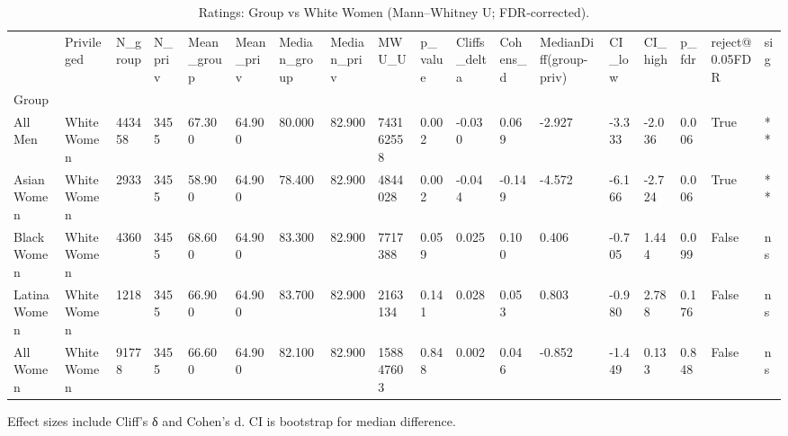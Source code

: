 \begin{table}[htbp]
\centering
\caption{Ratings: Group vs White Women (Mann–Whitney U; FDR-corrected).}
\label{tab:05-bias-ratings}
\begin{tabular}{llllllllllllllllll}
\toprule
 & Privileged & N\_group & N\_priv & Mean\_group & Mean\_priv & Median\_group & Median\_priv & MWU\_U & p\_value & Cliffs\_delta & Cohens\_d & MedianDiff(group-priv) & CI\_low & CI\_high & p\_fdr & reject@0.05FDR & sig \\
Group &  &  &  &  &  &  &  &  &  &  &  &  &  &  &  &  &  \\
\midrule
All Men & White Women & 443458 & 3455 & 67.300 & 64.900 & 80.000 & 82.900 & 743162558 & 0.002 & -0.030 & 0.069 & -2.927 & -3.333 & -2.036 & 0.006 & True & ** \\
Asian Women & White Women & 2933 & 3455 & 58.900 & 64.900 & 78.400 & 82.900 & 4844028 & 0.002 & -0.044 & -0.149 & -4.572 & -6.166 & -2.724 & 0.006 & True & ** \\
Black Women & White Women & 4360 & 3455 & 68.600 & 64.900 & 83.300 & 82.900 & 7717388 & 0.059 & 0.025 & 0.100 & 0.406 & -0.705 & 1.444 & 0.099 & False & ns \\
Latina Women & White Women & 1218 & 3455 & 66.900 & 64.900 & 83.700 & 82.900 & 2163134 & 0.141 & 0.028 & 0.053 & 0.803 & -0.980 & 2.788 & 0.176 & False & ns \\
All Women & White Women & 91778 & 3455 & 66.600 & 64.900 & 82.100 & 82.900 & 158847603 & 0.848 & 0.002 & 0.046 & -0.852 & -1.449 & 0.133 & 0.848 & False & ns \\
\bottomrule
\end{tabular}

\begin{tablenotes}[flushleft]
\item \small{Effect sizes include Cliff's δ and Cohen's d. CI is bootstrap for median difference.}
\end{tablenotes}
\end{table}
